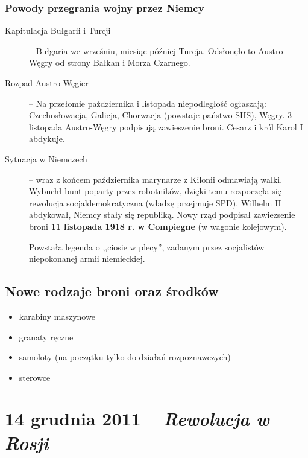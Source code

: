 \documentclass [a4paper, 11pt, oneside]{book}
\begin{document}
        \subsection{Powody przegrania wojny przez Niemcy} %
        \label{sub:powody_przegrania_wojny_przez_niemcy}
            \begin{description}
                \item[Kapitulacja Bułgarii i Turcji] -- Bułgaria we wrześniu, miesiąc później Turcja. Odsłonęło to Austro-Węgry od strony Bałkan i Morza Czarnego.
                \item[Rozpad Austro-Węgier] -- Na przełomie października i listopada niepodległość ogłaszają: Czechosłowacja, Galicja, Chorwacja (powstaje państwo SHS), Węgry. 3 listopada Austro-Węgry podpisują zawieszenie broni. Cesarz i król Karol I abdykuje.
                \item[Sytuacja w Niemczech] -- wraz z końcem października marynarze z Kilonii odmawiają walki. Wybuchł bunt poparty przez robotników, dzięki temu rozpoczęła się rewolucja socjaldemokratyczna (władzę przejmuje SPD). Wilhelm II abdykował, Niemcy stały się republiką. Nowy rząd podpisał zawiezsenie broni \textbf{11 listopada 1918 r. w Compiegne} (w wagonie kolejowym).

                Powstała legenda o ,,ciosie w plecy'', zadanym przez socjalistów niepokonanej armii niemieckiej.
            \end{description}
    \section{Nowe rodzaje broni oraz środków} %
    \label{sec:nowe_rodzaje_broni_oraz_rodk_w}
        \begin{itemize}
            \item karabiny maszynowe
            \item granaty ręczne
            \item samoloty (na początku tylko do działań rozpoznawczych)
            \item sterowce
        \end{itemize}
\chapter{14 grudnia 2011 -- \textit{Rewolucja w Rosji}} %
\label{cha:rewolucja_w_rosji}
\end{document}
